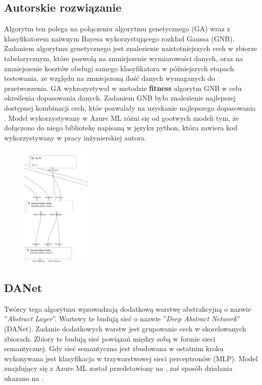 \subsection{Autorskie rozwiązanie}
Algorytm ten polega na połączeniu algorytmu genetycznego (GA) wraz z klasyfikatorem naiwnym Bayesa wykorzystującego rozkład Gaussa (GNB). Zadaniem algorytmu genetycznego jest znalezienie naistotniejszych cech w zbiorze tabelarycznym, które pozwolą na zmniejszenie wymiarowości danych, oraz na zmniejszenie kosztów obsługi samego klasyfikatora w późniejszych etapach testowania, ze względu na zmniejszoną ilość danych wymaganych do przetworzenia. GA wykrozystywał w metodzie \textbf{fitness} algorytm GNB w celu określenia dopasowania danych. Zadaniem GNB było znalezienie najlepszej dostępnej kombinacji cech, któe pozwalały na uzyskanie najlepszego dopasowania \cite{Blyszcz2022}. Model wykorzystywany w Azure ML różni się od gootwych modeli tym, że dołączono do niego bibliotekę napisaną w języku python, która zawiera kod wykorzystywany w pracy inżynierskiej autora\cite{Suvres2023}.
\begin{figure}[H]
    \centering
    \includegraphics[width=0.3\textwidth]{images/ga_pipe}
    \label{fig:ga-pipe}
\end{figure}

\subsection{DANet}
Twórcy tego algorytmu wprowadzają dodatkową warstwę abstrakcyjną o nazwie ''\textit{Abstract Layer}''. Wartswy te budują sieć o nazwie ''\textit{Deep Abstract Network}'' (DANet). Zadanie dodatkowych warstw jest grupowanie cech w skorelowanych zbiorach. Zbiory te budują sieć powiązań między sobą w formie sieci semantycznej. Gdy sieć semantyczna jest zbudowana w ostatnim kroku wykonywana jest klasyfikacja w trzywarstwowej sieci perceptronów  (MLP)\cite{Chen2022, Danet}. Model znajdujący się z Azure ML został przedstawiony na , zaś sposób działania ukazano na .

